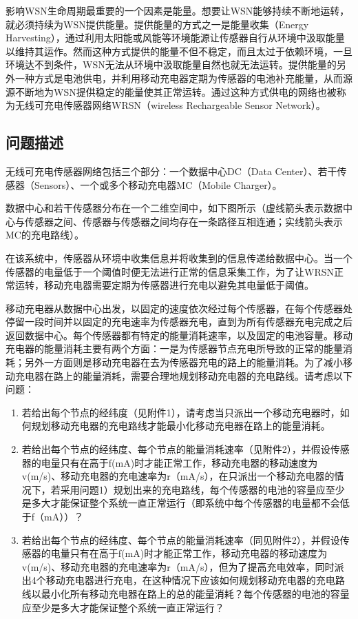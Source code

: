 \documentclass{article}
\begin{document}
影响WSN生命周期最重要的一个因素是能量。想要让WSN能够持续不断地运转，就必须持续为WSN提供能量。提供能量的方式之一是能量收集（Energy Harvesting），通过利用太阳能或风能等环境能源让传感器自行从环境中汲取能量以维持其运作。然而这种方式提供的能量不但不稳定，而且太过于依赖环境，一旦环境达不到条件，WSN无法从环境中汲取能量自然也就无法运转。提供能量的另外一种方式是电池供电，并利用移动充电器定期为传感器的电池补充能量，从而源源不断地为WSN提供稳定的能量使其正常运转。通过这种方式供电的网络也被称为无线可充电传感器网络WRSN（wireless Rechargeable Sensor Network）。
\subsection{问题描述}
无线可充电传感器网络包括三个部分：一个数据中心DC（Data Center）、若干传感器（Sensors）、一个或多个移动充电器MC（Mobile Charger）。

数据中心和若干传感器分布在一个二维空间中，如下图所示（虚线箭头表示数据中心与传感器之间、传感器与传感器之间均存在一条路径互相连通；实线箭头表示MC的充电路线）。

在该系统中，传感器从环境中收集信息并将收集到的信息传递给数据中心。当一个传感器的电量低于一个阈值时便无法进行正常的信息采集工作，为了让WRSN正常运转，移动充电器需要定期为传感器进行充电以避免其电量低于阈值。

移动充电器从数据中心出发，以固定的速度依次经过每个传感器，在每个传感器处停留一段时间并以固定的充电速率为传感器充电，直到为所有传感器充电完成之后返回数据中心。每个传感器都有特定的能量消耗速率，以及固定的电池容量。移动充电器的能量消耗主要有两个方面：一是为传感器节点充电所导致的正常的能量消耗；另外一方面则是移动充电器在去为传感器充电的路上的能量消耗。为了减小移动充电器在路上的能量消耗，需要合理地规划移动充电器的充电路线。请考虑以下问题：
\begin{enumerate}[\indent 1.]
\item 若给出每个节点的经纬度（见附件1），请考虑当只派出一个移动充电器时，如何规划移动充电器的充电路线才能最小化移动充电器在路上的能量消耗。

\item 若给出每个节点的经纬度、每个节点的能量消耗速率（见附件2），并假设传感器的电量只有在高于f(mA)时才能正常工作，移动充电器的移动速度为v(m/s)、移动充电器的充电速率为r（mA/s），在只派出一个移动充电器的情况下，若采用问题1）规划出来的充电路线，每个传感器的电池的容量应至少是多大才能保证整个系统一直正常运行（即系统中每个传感器的电量都不会低于f（mA））？

\item 若给出每个节点的经纬度、每个节点的能量消耗速率（同见附件2），并假设传感器的电量只有在高于f(mA)时才能正常工作，移动充电器的移动速度为v(m/s)、移动充电器的充电速率为r（mA/s），但为了提高充电效率，同时派出4个移动充电器进行充电，在这种情况下应该如何规划移动充电器的充电路线以最小化所有移动充电器在路上的总的能量消耗？每个传感器的电池的容量应至少是多大才能保证整个系统一直正常运行？
\end{enumerate}
\newpage
\end{document}
